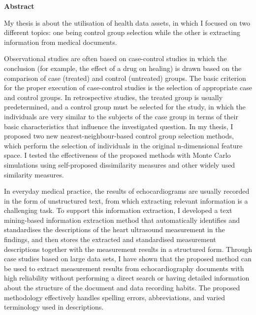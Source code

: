\centerline{\Large{\textbf{Abstract}}}

\vspace{0.6cm}

\noindent My thesis is about the utilisation of health data assets, in which I focused on two different topics: one being control group selection while the other is extracting information from medical documents. 

Observational studies are often based on case-control studies in which the conclusion (for example, the effect of a drug on healing) is drawn based on the comparison of case (treated) and control (untreated) groups. The basic criterion for the proper execution of case-control studies is the selection of appropriate case and control groups. In retrospective studies, the treated group is usually predetermined, and a control group must be selected for the study, in which the individuals are very similar to the subjects of the case group in terms of their basic characteristics that influence the investigated question. In my thesis, I proposed two new nearest-neighbour-based control group selection methods, which perform the selection of individuals in the original n-dimensional feature space. I tested the effectiveness of the proposed methods with Monte Carlo simulations using self-proposed dissimilarity measures and other widely used similarity measures. 

In everyday medical practice, the results of echocardiograms are usually recorded in the form of unstructured text, from which extracting relevant information is a challenging task. To support this information extraction, I developed a text mining-based information extraction method that automatically identifies and standardises the descriptions of the heart ultrasound measurement in the findings, and then stores the extracted and standardised measurement descriptions together with the measurement results in a structured form. Through case studies based on large data sets, I have shown that the proposed method can be used to extract measurement results from echocardiography documents with high reliability without performing a direct search or having detailed information about the structure of the document and data recording habits. The proposed methodology effectively handles spelling errors, abbreviations, and varied terminology used in descriptions.
